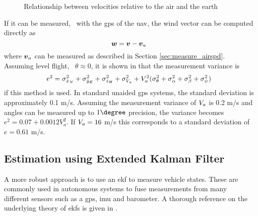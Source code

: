 \begin{figure}
    \begin{center}
    \end{center}
    \caption{Relationship between velocities relative to the air and the earth}
    \label{fig:wind_triangle}    
\end{figure}
If it can be measured, \eg\ with the \ac{gps} of the \ac{uav}, the wind vector can be 
computed directly as 
\begin{equation}
    \boldsymbol{w} = \boldsymbol{v} - \boldsymbol{v}_a
\end{equation}
where $\boldsymbol{v}_a$ can be measured as described in Section \ref{sec:measure_airspd}.
Assuming level flight, \ie\ $\theta\approx0$, it is shown in \cite{wind_direct_computation} that the measurement variance is
\begin{equation}
    e^2=\sigma_{\dot{x}_N}^2+\sigma_{\dot{y}_E}^2+\sigma_{\dot{z}_H}^2+\sigma_{V_a}^2 + V_a^2(\sigma_{\theta}^2+\sigma_{\alpha}^2+\sigma_{\beta}^2+\sigma_{\psi}^2)
\end{equation}
if this method is used. In standard unaided \ac{gps} systems, the standard deviation is approximately 0.1 m/s. Assuming the measurement variance of $V_a$ is 0.2 m/s and angles 
can be measured up to $1\degree$ precision, the variance becomes $e^2=0.07+0.0012V_a^2$. If $V_a=16$ m/s this corresponds to a standard deviation of 
$e=0.61$ m/s.
\subsection{Estimation using Extended Kalman Filter}\label{sec:wind_ekf}
A more robust approach is to use an \ac{ekf} to measure vehicle states. These are 
commonly used in autonomous systems to fuse measurements from many different sensors such as a \ac{gps}, \ac{imu} and barometer. 
A thorough reference on the underlying theory of \acp{ekf} is given in \cite{sensor_fusion}.

